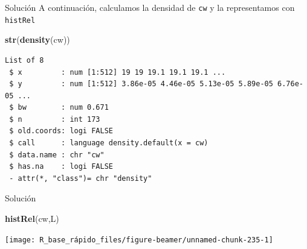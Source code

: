 \documentclass[
  ignorenonframetext,
  aspectratio=169]{beamer}
\newenvironment{Shaded}{\begin{snugshade}}{\end{snugshade}}
\newcommand{\FunctionTok}[1]{\textcolor[rgb]{0.13,0.29,0.53}{\textbf{#1}}}
\newcommand{\NormalTok}[1]{#1}
\begin{document}
\begin{frame}[fragile]{Solución}
\label{soluciuxf3n-44}
A continuación, calculamos la densidad de \texttt{cw} y la representamos
con \texttt{histRel}

\begin{Shaded}
\begin{Highlighting}[]
\FunctionTok{str}\NormalTok{(}\FunctionTok{density}\NormalTok{(cw))}
\end{Highlighting}
\end{Shaded}

\begin{verbatim}
List of 8
 $ x         : num [1:512] 19 19 19.1 19.1 19.1 ...
 $ y         : num [1:512] 3.86e-05 4.46e-05 5.13e-05 5.89e-05 6.76e-05 ...
 $ bw        : num 0.671
 $ n         : int 173
 $ old.coords: logi FALSE
 $ call      : language density.default(x = cw)
 $ data.name : chr "cw"
 $ has.na    : logi FALSE
 - attr(*, "class")= chr "density"
\end{verbatim}
\end{frame}

\begin{frame}[fragile]{Solución}
\label{soluciuxf3n-45}
\begin{Shaded}
\begin{Highlighting}[]
\FunctionTok{histRel}\NormalTok{(cw,L)}
\end{Highlighting}
\end{Shaded}

\begin{center}\texttt{[image: R\_base\_rápido\_files/figure-beamer/unnamed-chunk-235-1]} \end{center}
\end{frame}
\end{document}
